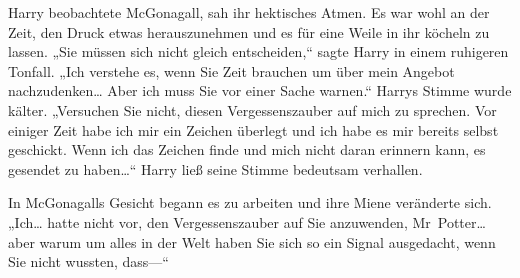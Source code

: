 Harry beobachtete McGonagall, sah ihr hektisches Atmen. Es war wohl an der Zeit, den Druck etwas herauszunehmen und es für eine Weile in ihr köcheln zu lassen. „Sie müssen sich nicht gleich entscheiden,“ sagte Harry in einem ruhigeren Tonfall. „Ich verstehe es, wenn Sie Zeit brauchen um über mein Angebot nachzudenken… Aber ich muss Sie vor einer Sache warnen.“ Harrys Stimme wurde kälter. „Versuchen Sie nicht, diesen Vergessenszauber auf mich zu sprechen. Vor einiger Zeit habe ich mir ein Zeichen überlegt und ich habe es mir bereits selbst geschickt. Wenn ich das Zeichen finde und mich nicht daran erinnern kann, es gesendet zu haben…“ Harry ließ seine Stimme bedeutsam verhallen.

In McGonagalls Gesicht begann es zu arbeiten und ihre Miene veränderte sich. „Ich… hatte nicht vor, den Vergessenszauber auf Sie anzuwenden, Mr~Potter… aber warum um alles in der Welt haben Sie sich so ein Signal ausgedacht, wenn Sie nicht wussten, dass—“

